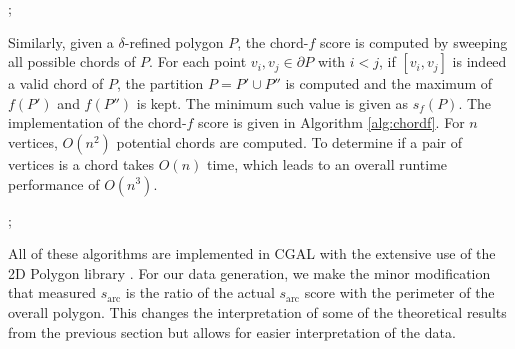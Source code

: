 \documentclass[]{jocg}
\newcommand{\chordarc}{{s_{\textrm{arc}}}}
\theoremstyle{definition}
\theoremstyle{remark}
\begin{document}
\begin{algorithm}[h]
  \begin{algorithmic}[1]
    ;
     
    \EndIf
    \EndFor
    \EndFor
    \EndFunction
  \end{algorithmic}
  \caption{%
    The $\alpha$-fatness function.  }
  \label{alg:alpha}
\end{algorithm}

Similarly, given a $\delta$-refined polygon $P$, the chord-$f$ score is computed
by sweeping all possible chords of $P$. For each point $v_i, v_j \in \partial P$
with $i < j$, if $[v_i, v_j]$ is indeed a valid chord of $P$, the partition $P =
P' \cup P''$ is computed and the maximum of $f(P')$ and $f(P'')$ is kept. The
minimum such value is given as $s_f(P)$. The implementation of the chord-$f$
score is given in Algorithm \ref{alg:chordf}. For $n$ vertices, $O(n^2)$
potential chords are computed. To determine if a pair of vertices is a chord
takes $O(n)$ time, which leads to an overall runtime performance of $O(n^3)$.



\begin{algorithm}[h]
  \begin{algorithmic}[1]
    ;
      \EndIf
    \EndIf
    \EndFor
    \EndFor
    \EndFunction
  \end{algorithmic}
  \caption{%
    The chord-$f$ function.   }
  \label{alg:chordf}
\end{algorithm}

All of these algorithms are implemented in CGAL \cite{cgal:eb-18a} with the
extensive use of the 2D Polygon library \cite{cgal:gw-p2-18a}. For our data
generation, we make the minor modification that measured ${\chordarc}$ is the
ratio of the actual $\chordarc$ score with the perimeter of the overall polygon.
This changes the interpretation of some of the theoretical results from the
previous section but allows for easier interpretation of the data.
\end{document}
